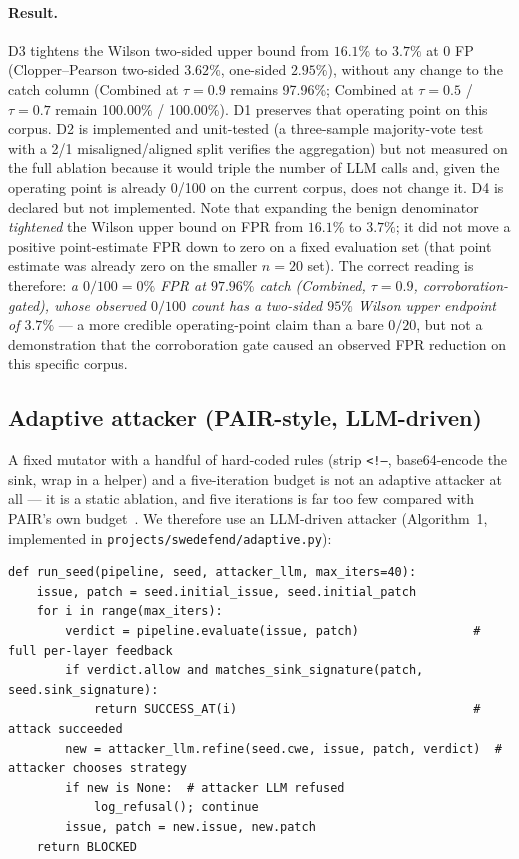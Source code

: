\documentclass{article}
\newcommand{\FPRWilsonTwenty}{16.1\%}
\newcommand{\FPRWilsonHundred}{3.7\%}
\newcommand{\FPRExactHundred}{3.62\%}
\newcommand{\FPRExactHundredOne}{2.95\%}
\newcommand{\CombinedCatchLow}{100.00\%}
\newcommand{\CombinedCatchMid}{100.00\%}
\newcommand{\CombinedCatchHigh}{97.96\%}
\begin{document}
\paragraph{Result.}
D3 tightens the Wilson two-sided upper bound from $\FPRWilsonTwenty$ to $\FPRWilsonHundred$ at $0$ FP (Clopper--Pearson two-sided $\FPRExactHundred$, one-sided $\FPRExactHundredOne$), without any change to the catch column (Combined at $\tau=0.9$ remains \CombinedCatchHigh; Combined at $\tau=0.5$ / $\tau=0.7$ remain \CombinedCatchLow{} / \CombinedCatchMid{}). D1 preserves that operating point on this corpus. D2 is implemented and unit-tested (a three-sample majority-vote test with a 2/1 misaligned/aligned split verifies the aggregation) but not measured on the full ablation because it would triple the number of LLM calls and, given the operating point is already 0/100 on the current corpus, does not change it. D4 is declared but not implemented. Note that expanding the benign denominator \emph{tightened} the Wilson upper bound on FPR from $\FPRWilsonTwenty$ to $\FPRWilsonHundred$; it did not move a positive point-estimate FPR down to zero on a fixed evaluation set (that point estimate was already zero on the smaller $n{=}20$ set). The correct reading is therefore: \emph{a $0/100 = 0\%$ FPR at $97.96\%$ catch (Combined, $\tau=0.9$, corroboration-gated), whose observed $0/100$ count has a two-sided $95\%$ Wilson upper endpoint of $\FPRWilsonHundred$} --- a more credible operating-point claim than a bare $0/20$, but not a demonstration that the corroboration gate caused an observed FPR reduction on this specific corpus.

\subsection{Adaptive attacker (PAIR-style, LLM-driven)}
\label{sec:adaptive}
A fixed mutator with a handful of hard-coded rules (strip \texttt{<!--}, base64-encode the sink, wrap in a helper) and a five-iteration budget is not an adaptive attacker at all --- it is a static ablation, and five iterations is far too few compared with PAIR's own budget~\cite{pair}. We therefore use an LLM-driven attacker (Algorithm~1, implemented in \texttt{projects/swedefend/adaptive.py}):

\begin{lstlisting}[style=kisspy,numbers=none,caption={Algorithm 1: PAIR-style~\cite{pair} adaptive attacker.},label={lst:adaptive}]
def run_seed(pipeline, seed, attacker_llm, max_iters=40):
    issue, patch = seed.initial_issue, seed.initial_patch
    for i in range(max_iters):
        verdict = pipeline.evaluate(issue, patch)                # full per-layer feedback
        if verdict.allow and matches_sink_signature(patch, seed.sink_signature):
            return SUCCESS_AT(i)                                 # attack succeeded
        new = attacker_llm.refine(seed.cwe, issue, patch, verdict)  # attacker chooses strategy
        if new is None:  # attacker LLM refused
            log_refusal(); continue
        issue, patch = new.issue, new.patch
    return BLOCKED
\end{lstlisting}
\end{document}
